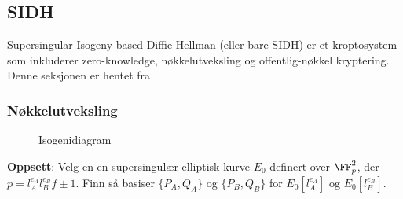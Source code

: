 \subsection{SIDH}
Supersingular Isogeny-based Diffie Hellman (eller bare SIDH) er et kroptosystem som inkluderer zero-knowledge, nøkkelutveksling og offentlig-nøkkel kryptering. Denne seksjonen er hentet fra \cite{sidh}
\subsubsection{Nøkkelutveksling}
\begin{figure}[h!]
    \centering
    \caption{Isogenidiagram}
    \label{fig:my_label}
\end{figure}
\textbf{Oppsett}: Velg en en supersingulær elliptisk kurve $E_0$ definert over $\FF_p^2$, der $p = l_A^{e_A}l_B^{e_B}f \pm 1 $. Finn så basiser $\{P_A, Q_A\}$ og $\{P_B, Q_B\}$ for $E_0[l_A^{e_A}]$ og $E_0[l_B^{e_B}]$.
\\

\\

